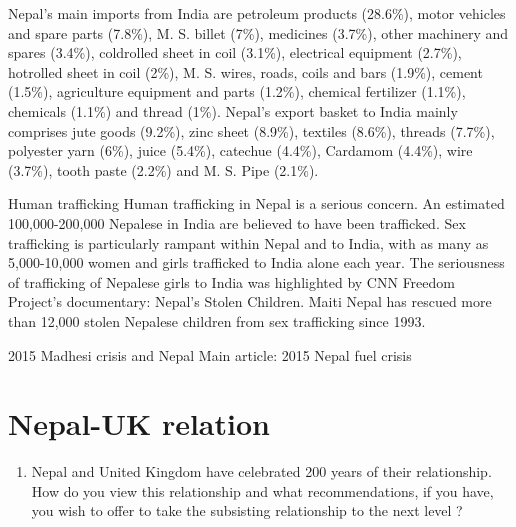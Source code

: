 \documentclass[
  openany]{book}
\providecommand{\tightlist}{%
  \setlength{\itemsep}{0pt}\setlength{\parskip}{0pt}}
\begin{document}
Nepal's main imports from India are petroleum products (28.6\%), motor vehicles and spare parts (7.8\%), M. S. billet (7\%), medicines (3.7\%), other machinery and spares (3.4\%), coldrolled sheet in coil (3.1\%), electrical equipment (2.7\%), hotrolled sheet in coil (2\%), M. S. wires, roads, coils and bars (1.9\%), cement (1.5\%), agriculture equipment and parts (1.2\%), chemical fertilizer (1.1\%), chemicals (1.1\%) and thread (1\%). Nepal's export basket to India mainly comprises jute goods (9.2\%), zinc sheet (8.9\%), textiles (8.6\%), threads (7.7\%), polyester yarn (6\%), juice (5.4\%), catechue (4.4\%), Cardamom (4.4\%), wire (3.7\%), tooth paste (2.2\%) and M. S. Pipe (2.1\%).

Human trafficking
Human trafficking in Nepal is a serious concern. An estimated 100,000-200,000 Nepalese in India are believed to have been trafficked. Sex trafficking is particularly rampant within Nepal and to India, with as many as 5,000-10,000 women and girls trafficked to India alone each year. The seriousness of trafficking of Nepalese girls to India was highlighted by CNN Freedom Project's documentary: Nepal's Stolen Children. Maiti Nepal has rescued more than 12,000 stolen Nepalese children from sex trafficking since 1993.

2015 Madhesi crisis and Nepal
Main article: 2015 Nepal fuel crisis

\hypertarget{nepal-uk-relation}{%
\section{Nepal-UK relation}\label{nepal-uk-relation}}

\begin{enumerate}
\def\labelenumi{\arabic{enumi}.}
\tightlist
\item
  Nepal and United Kingdom have celebrated 200 years of their relationship. How do you view this relationship and what recommendations, if you have, you wish to offer to take the subsisting relationship to the next level ?
\end{enumerate}
\end{document}
